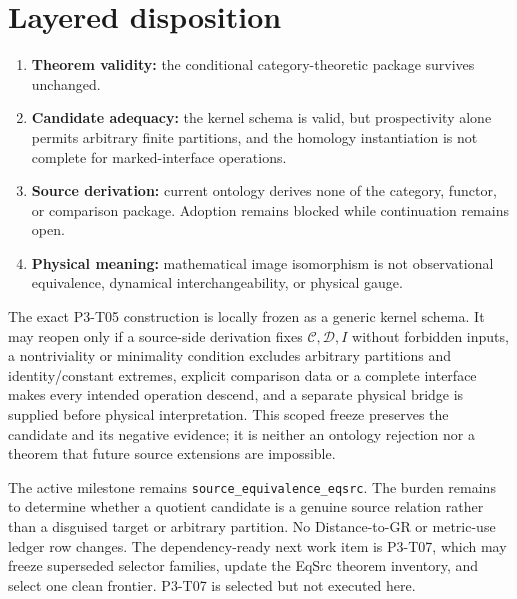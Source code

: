 \documentclass[11pt]{article}
\begin{document}
\section{Layered disposition}

\begin{enumerate}
  \item \textbf{Theorem validity:} the conditional category-theoretic package
  survives unchanged.
  \item \textbf{Candidate adequacy:} the kernel schema is valid, but
  prospectivity alone permits arbitrary finite partitions, and the homology
  instantiation is not complete for marked-interface operations.
  \item \textbf{Source derivation:} current ontology derives none of the
  category, functor, or comparison package.  Adoption remains blocked while
  continuation remains open.
  \item \textbf{Physical meaning:} mathematical image isomorphism is not
  observational equivalence, dynamical interchangeability, or physical gauge.
\end{enumerate}

The exact P3-T05 construction is locally frozen as a generic kernel schema.
It may reopen only if a source-side derivation fixes \(\mathcal C,\mathcal
D,I\) without forbidden inputs, a nontriviality or minimality condition
excludes arbitrary partitions and identity/constant extremes, explicit
comparison data or a complete interface makes every intended operation
descend, and a separate physical bridge is supplied before physical
interpretation.  This scoped freeze preserves the candidate and its negative
evidence; it is neither an ontology rejection nor a theorem that future
source extensions are impossible.

The active milestone remains \texttt{source\_equivalence\_eqsrc}.  The burden
remains to determine whether a quotient candidate is a genuine source relation
rather than a disguised target or arbitrary partition.  No Distance-to-GR or
metric-use ledger row changes.  The dependency-ready next work item is
P3-T07, which may freeze superseded selector families, update the EqSrc theorem
inventory, and select one clean frontier.  P3-T07 is selected but not executed
here.
\end{document}
